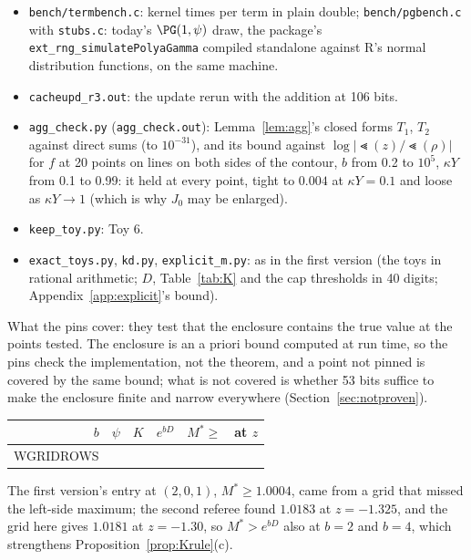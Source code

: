 \begin{itemize}
\texttt{cost3\_d.out}; \texttt{ONLY=DEF} runs, for the coarsest certified $h$, in \texttt{cost3\_def1.out},
\texttt{cost3\_def2.out}); \texttt{cost3\_table.py} charges the a-priori cascade and prices it
(\texttt{cost3\_table.md}, every point; \texttt{cost3\_note.tex}, the table in the note).
\item \texttt{bench/termbench.c}: kernel times per term in plain double; \texttt{bench/pgbench.c} with
\texttt{stubs.c}: today's $\PG(1,\psi)$ draw, the package's \texttt{ext\_rng\_simulatePolyaGamma} compiled
standalone against R's normal distribution functions, on the same machine.
\item \texttt{cacheupd\_r3.out}: the update rerun with the addition at 106 bits.
\item \texttt{agg\_check.py} (\texttt{agg\_check.out}): Lemma~\ref{lem:agg}'s closed forms $T_1$, $T_2$ against
direct sums (to $10^{-31}$), and its bound against $\log|\Lt(z)/\Lt(\rho)|$ for $f$ at 20 points on lines on both
sides of the contour, $b$ from 0.2 to $10^5$, $\kappa Y$ from 0.1 to 0.99: it held at every point, tight to
$0.004$ at $\kappa Y=0.1$ and loose as $\kappa Y\to1$ (which is why $J_0$ may be enlarged).
\item \texttt{keep\_toy.py}: Toy 6.
\item \texttt{exact\_toys.py}, \texttt{kd.py}, \texttt{explicit\_m.py}: as in the first version (the toys in rational
arithmetic; $D$, Table~\ref{tab:K} and the cap thresholds in 40 digits; Appendix~\ref{app:explicit}'s bound).
\end{itemize}

What the pins cover: they test that the enclosure contains the true value at the points tested. The enclosure is
an a priori bound computed at run time, so the pins check the implementation, not the theorem, and a point not
pinned is covered by the same bound; what is not covered is whether 53 bits suffice to make the enclosure finite
and narrow everywhere (Section~\ref{sec:notproven}).

\begin{center}\small
\begin{tabular}{rrrrrr}\toprule
$b$ & $\psi$ & $K$ & $e^{bD}$ & $M^*\ge$ & at $z$\\\midrule
WGRIDROWS
\bottomrule
\end{tabular}
\end{center}
The first version's entry at $(2,0,1)$, $M^*\ge1.0004$, came from a grid that missed the left-side maximum; the
second referee found $1.0183$ at $z=-1.325$, and the grid here gives $1.0181$ at $z=-1.30$, so $M^*>e^{bD}$ also
at $b=2$ and $b=4$, which strengthens Proposition~\ref{prop:Krule}(c).

